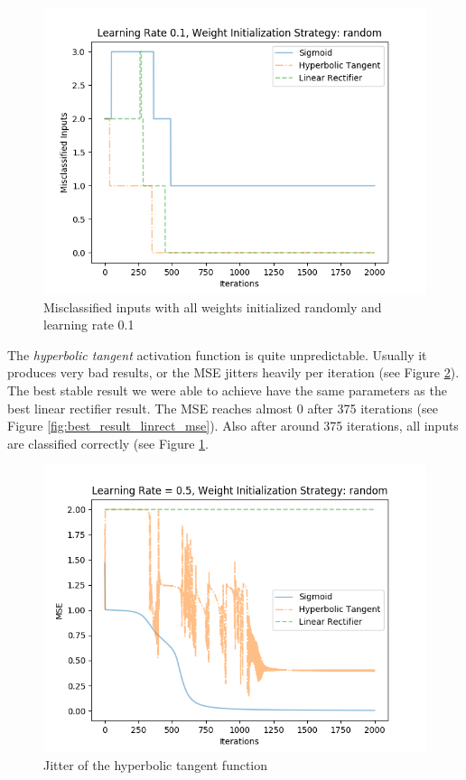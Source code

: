 \documentclass{article}
\begin{document}
\begin{figure}[H]
	\centering
	\includegraphics[width=0.9\linewidth]{img/5/linear-rectifier-inputs.png}
	\caption{Misclassified inputs with all weights initialized randomly and learning rate 0.1}
	\label{fig:best_result_linrect_inputs}
\end{figure}


The \emph{hyperbolic tangent} activation function is quite unpredictable. Usually it produces very bad results, or the MSE jitters heavily per iteration (see Figure \ref{fig:tangent-jitter}).
The best stable result we were able to achieve have the same parameters as the best linear rectifier result. The MSE reaches almost 0 after 375 iterations (see Figure \ref{fig:best_result_linrect_mse}). Also after around 375 iterations, all inputs are classified correctly (see Figure \ref{fig:best_result_linrect_inputs}.

\begin{figure}[H]
	\centering
	\includegraphics[width=0.9\linewidth]{img/5/tangent-jitter.png}
	\caption{Jitter of the hyperbolic tangent function}
	\label{fig:tangent-jitter}
\end{figure}
\end{document}
